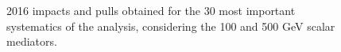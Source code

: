\documentclass[a4paper, 10pt, openright]{report}
\begin{document}
\begin{appendices}
\begin{figure}[htbp]
\centering
{}
\caption{2016 impacts and pulls obtained for the 30 most important systematics of the analysis, considering the 100 and 500 GeV scalar mediators.}
\label{fig:impactsScalar}
\end{figure}


\end{appendices}
\end{document}
